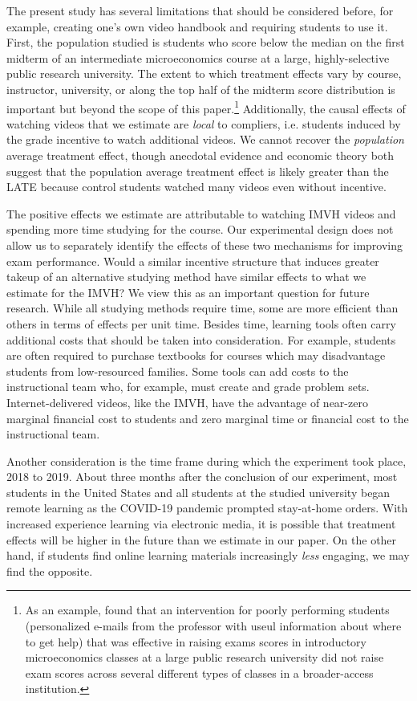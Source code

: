 \documentclass[12pt]{article}
\begin{document}
The present study has several limitations that should be considered before, for example, creating one's own video handbook and requiring students to use it. First, the population studied is students who score below the median on the first midterm of an intermediate microeconomics course at a large, highly-selective public research university. The extent to which treatment effects vary by course, instructor, university, or along the top half of the midterm score distribution is important but beyond the scope of this paper.\footnote{As an example, \textcite{ck2020} found that an intervention for poorly performing students (personalized e-mails from the professor with useul information about where to get help) that was effective in raising exams scores in introductory microeconomics classes at a large public research university did not raise exam scores across several different types of classes in a broader-access institution.} Additionally, the causal effects of watching videos that we estimate are \textit{local} to compliers, i.e. students induced by the grade incentive to watch additional videos. We cannot recover the \textit{population} average treatment effect, though anecdotal evidence and economic theory both suggest that the population average treatment effect is likely greater than the LATE because control students watched many videos even without incentive.

The positive effects we estimate are attributable to watching IMVH videos and spending more time studying for the course. Our experimental design does not allow us to separately identify the effects of these two mechanisms for improving exam performance. Would a similar incentive structure that induces greater takeup of an alternative studying method have similar effects to what we estimate for the IMVH? We view this as an important question for future research. While all studying methods require time, some are more efficient than others in terms of effects per unit time. Besides time, learning tools often carry additional costs that should be taken into consideration. For example, students are often required to purchase textbooks for courses which may disadvantage students from low-resourced families. Some tools can add costs to the instructional team who, for example, must create and grade problem sets. Internet-delivered videos, like the IMVH, have the advantage of near-zero marginal financial cost to students and zero marginal time or financial cost to the instructional team.

Another consideration is the time frame during which the experiment took place, 2018 to 2019. About three months after the conclusion of our experiment, most students in the United States and all students at the studied university began remote learning as the COVID-19 pandemic prompted stay-at-home orders. With increased experience learning via electronic media, it is possible that treatment effects will be higher in the future than we estimate in our paper. On the other hand, if students find online learning materials increasingly \textit{less} engaging, we may find the opposite.
\end{document}
